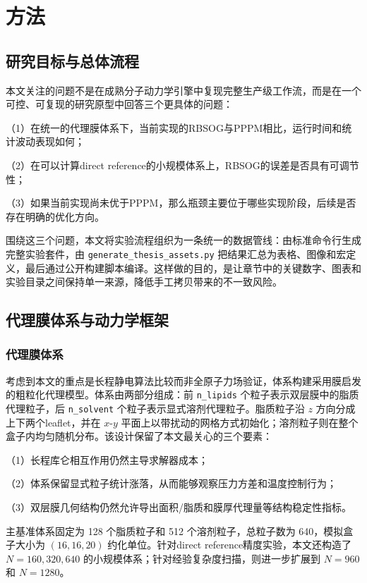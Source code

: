 \chapter{方法}\label{chap:method}

\section{研究目标与总体流程}

本文关注的问题不是在成熟分子动力学引擎中复现完整生产级工作流，而是在一个可控、可复现的研究原型中回答三个更具体的问题：

（1）在统一的代理膜体系下，当前实现的RBSOG与PPPM相比，运行时间和统计波动表现如何；

（2）在可以计算direct reference的小规模体系上，RBSOG的误差是否具有可调节性；

（3）如果当前实现尚未优于PPPM，那么瓶颈主要位于哪些实现阶段，后续是否存在明确的优化方向。

围绕这三个问题，本文将实验流程组织为一条统一的数据管线：由标准命令行生成完整实验套件，由 \texttt{generate\_thesis\_assets.py} 把结果汇总为表格、图像和宏定义，最后通过公开构建脚本编译。这样做的目的，是让章节中的关键数字、图表和实验目录之间保持单一来源，降低手工拷贝带来的不一致风险。

\section{代理膜体系与动力学框架}

\subsection{代理膜体系}

考虑到本文的重点是长程静电算法比较而非全原子力场验证，体系构建采用膜启发的粗粒化代理模型。体系由两部分组成：前 \texttt{n\_lipids} 个粒子表示双层膜中的脂质代理粒子，后 \texttt{n\_solvent} 个粒子表示显式溶剂代理粒子。脂质粒子沿 $z$ 方向分成上下两个leaflet，并在 $x$-$y$ 平面上以带扰动的网格方式初始化；溶剂粒子则在整个盒子内均匀随机分布。该设计保留了本文最关心的三个要素：

（1）长程库仑相互作用仍然主导求解器成本；

（2）体系保留显式粒子统计涨落，从而能够观察压力方差和温度控制行为；

（3）双层膜几何结构仍然允许导出面积/脂质和膜厚代理量等结构稳定性指标。

主基准体系固定为 128 个脂质粒子和 512 个溶剂粒子，总粒子数为 640，模拟盒子大小为 $(16,16,20)$ 约化单位。针对direct reference精度实验，本文还构造了 $N=160,320,640$ 的小规模体系；针对经验复杂度扫描，则进一步扩展到 $N=960$ 和 $N=1280$。

